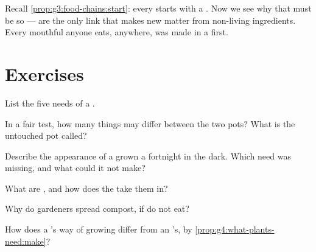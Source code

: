 \begin{remark}\label{rem:g4:what-plants-need:everyone}
Recall \cref{prop:g3:food-chains:start}: every  starts
with a . Now we see why that must be so ---  are the
only link that makes new matter from non-living ingredients.
Every mouthful anyone eats, anywhere, was made in a  first.
\end{remark}

\section{Exercises}

\begin{exercise}[$\star$]\label{exo:g4:what-plants-need:1}
List the five needs of a .
\end{exercise}

\begin{exercise}[$\star$]\label{exo:g4:what-plants-need:2}
In a fair test, how many things may differ between the two
pots? What is the untouched pot called?
\end{exercise}

\begin{exercise}[$\star$]\label{exo:g4:what-plants-need:3}
Describe the appearance of a  grown a fortnight in the
dark. Which need was missing, and what could it not make?
\end{exercise}

\begin{exercise}[$\star$]\label{exo:g4:what-plants-need:4}
What are , and how does the  take them in?
\end{exercise}

\begin{exercise}[$\star$]\label{exo:g4:what-plants-need:5}
Why do gardeners spread compost, if  do not eat?
\end{exercise}

\begin{exercise}[$\star$]\label{exo:g4:what-plants-need:6}
How does a 's way of growing differ from an 's, by
\cref{prop:g4:what-plants-need:make}?
\end{exercise}

